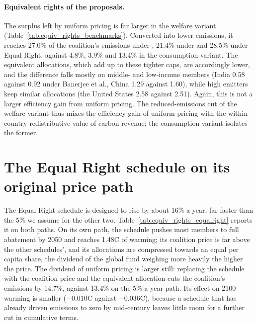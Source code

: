 \documentclass[12pt,english]{article}
\theoremstyle{remark}
\begin{document}
\paragraph{Equivalent rights of the proposals.} The surplus left by uniform pricing is far larger in the welfare variant (Table~\ref{tab:equiv_rights_benchmarks}). Converted into lower emissions, it reaches 27.0\% of the coalition's emissions under \citet{wolfram_building_2025}, 21.4\% under \citet{banerjee_grand_2025} and 28.5\% under Equal Right, against 4.8\%, 3.9\% and 13.4\% in the consumption variant. The equivalent allocations, which add up to these tighter caps, are accordingly lower, and the difference falls mostly on middle- and low-income members (India 0.58 against 0.92 under Banerjee et al., China 1.29 against 1.60), while high emitters keep similar allocations (the United States 2.58 against 2.51). Again, this is not a larger efficiency gain from uniform pricing.
The reduced-emissions cut of the welfare variant thus mixes the efficiency gain of uniform pricing with the within-country redistributive value of carbon revenue; the consumption variant isolates the former.

\clearpage
\section{The Equal Right schedule on its original price path}
\label{app:ede}

The Equal Right schedule is designed to rise by about 16\% a year, far faster than the 5\% we assume for the other two. Table~\ref{tab:equiv_rights_equalright} reports it on both paths. On its own path, the schedule pushes most members to full abatement by 2050 and reaches 1.48\textdegree C of warming; its coalition price is far above the other schedules', and its allocations are compressed towards an equal per capita share, the dividend of the global fund weighing more heavily the higher the price. The dividend of uniform pricing is larger still: replacing the schedule with the coalition price and the equivalent allocation cuts the coalition's emissions by 14.7\%, against 13.4\% on the 5\%-a-year path. Its effect on 2100 warming is smaller ($-0.010$\textdegree C against $-0.036$\textdegree C), because a schedule that has already driven emissions to zero by mid-century leaves little room for a further cut in cumulative terms.

\end{document}
